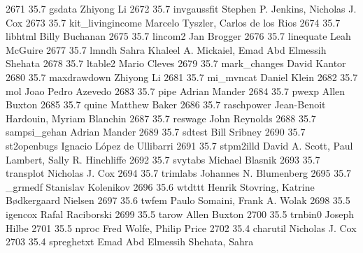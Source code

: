   2671     35.7    gsdata        Zhiyong Li                              
  2672     35.7    invgaussfit   Stephen P. Jenkins, Nicholas J. Cox     
  2673     35.7    kit_livingincome  Marcelo Tyszler, Carlos de los Rios     
  2674     35.7    libhtml       Billy Buchanan                          
  2675     35.7    lincom2       Jan Brogger                             
  2676     35.7    linequate     Leah McGuire                            
  2677     35.7    lmndh         Sahra Khaleel A. Mickaiel, Emad Abd     
                                   Elmessih Shehata                        
  2678     35.7    ltable2       Mario Cleves                            
  2679     35.7    mark_changes  David Kantor                            
  2680     35.7    maxdrawdown   Zhiyong Li                              
  2681     35.7    mi_mvncat     Daniel Klein                            
  2682     35.7    mol           Joao Pedro Azevedo                      
  2683     35.7    pipe          Adrian Mander                           
  2684     35.7    pwexp         Allen Buxton                            
  2685     35.7    quine         Matthew Baker                           
  2686     35.7    raschpower    Jean-Benoit Hardouin, Myriam Blanchin   
  2687     35.7    reswage       John Reynolds                           
  2688     35.7    sampsi_gehan  Adrian Mander                           
  2689     35.7    sdtest        Bill Sribney                            
  2690     35.7    st2openbugs   Ignacio López de Ullibarri             
  2691     35.7    stpm2illd     David A. Scott, Paul Lambert, Sally R.  
                                   Hinchliffe                              
  2692     35.7    svytabs       Michael Blasnik                         
  2693     35.7    transplot     Nicholas J. Cox                         
  2694     35.7    trimlabs      Johannes N. Blumenberg                  
  2695     35.7    _grmedf       Stanislav Kolenikov                     
  2696     35.6    wtdttt        Henrik Stovring, Katrine Bødkergaard   
                                   Nielsen                                 
  2697     35.6    twfem         Paulo Somaini, Frank A. Wolak           
  2698     35.5    igencox       Rafal Raciborski                        
  2699     35.5    tarow         Allen Buxton                            
  2700     35.5    trnbin0       Joseph Hilbe                            
  2701     35.5    nproc         Fred Wolfe, Philip Price                
  2702     35.4    charutil      Nicholas J. Cox                         
  2703     35.4    spreghetxt    Emad Abd Elmessih Shehata, Sahra        
